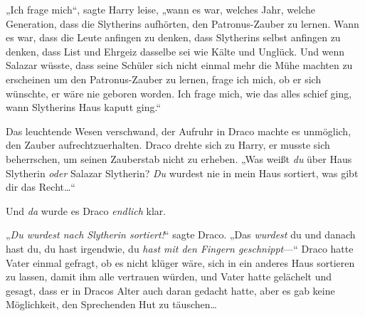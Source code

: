 „Ich frage mich“, sagte Harry leise, „wann es war, welches Jahr, welche Generation, dass die Slytherins aufhörten, den Patronus-Zauber zu lernen. Wann es war, dass die Leute anfingen zu denken, dass Slytherins selbst anfingen zu denken, dass List und Ehrgeiz dasselbe sei wie Kälte und Unglück. Und wenn Salazar wüsste, dass seine Schüler sich nicht einmal mehr die Mühe machten zu erscheinen um den Patronus-Zauber zu lernen, frage ich mich, ob er sich wünschte, er wäre nie geboren worden. Ich frage mich, wie das alles schief ging, wann Slytherins Haus kaputt ging.“

Das leuchtende Wesen verschwand, der Aufruhr in Draco machte es unmöglich, den Zauber aufrechtzuerhalten. Draco drehte sich zu Harry, er musste sich beherrschen, um seinen Zauberstab nicht zu erheben. „Was weißt \emph{du} über Haus Slytherin \emph{oder} Salazar Slytherin? \emph{Du} wurdest nie in mein Haus sortiert, was gibt dir das Recht…“

Und \emph{da} wurde es Draco \emph{endlich} klar.

„\emph{Du wurdest nach Slytherin sortiert!}“ sagte Draco. „Das \emph{wurdest} du und danach hast du, du hast irgendwie, du \emph{hast mit den Fingern geschnippt}—“ Draco hatte Vater einmal gefragt, ob es nicht klüger wäre, sich in ein anderes Haus sortieren zu lassen, damit ihm alle vertrauen würden, und Vater hatte gelächelt und gesagt, dass er in Dracos Alter auch daran gedacht hatte, aber es gab keine Möglichkeit, den Sprechenden Hut zu täuschen…

